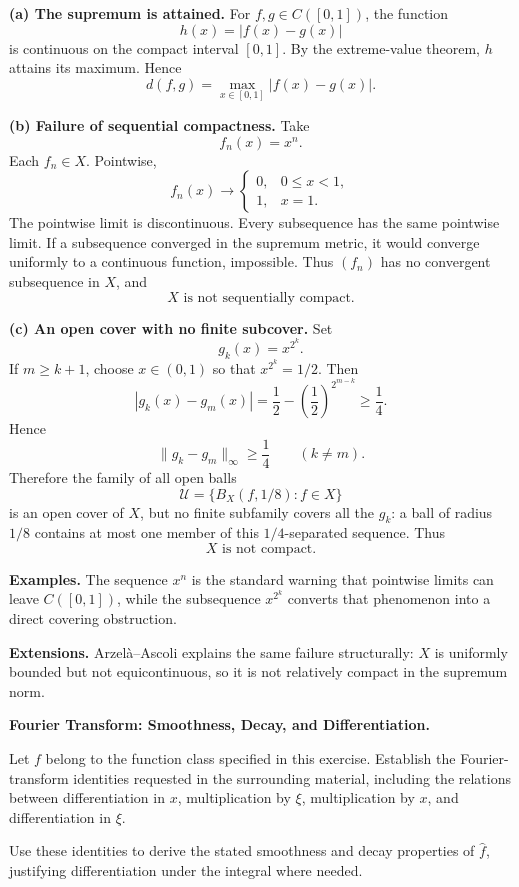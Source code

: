 \begin{solution}

\par\smallskip\noindent\textbf{(a) The supremum is attained.}
For \(f,g\in C([0,1])\), the function
\[
h(x)=|f(x)-g(x)|
\]
is continuous on the compact interval \([0,1]\). By the extreme-value
theorem, \(h\) attains its maximum. Hence
\[
\boxed{d(f,g)=\max_{x\in[0,1]}|f(x)-g(x)|.}
\]

\par\smallskip\noindent\textbf{(b) Failure of sequential compactness.}
Take
\[
f_n(x)=x^n.
\]
Each \(f_n\in X\). Pointwise,
\[
f_n(x)\to
\begin{cases}
0,&0\le x<1,\\
1,&x=1.
\end{cases}
\]
The pointwise limit is discontinuous. Every subsequence has the same pointwise
limit. If a subsequence converged in the supremum metric, it would converge
uniformly to a continuous function, impossible. Thus \((f_n)\) has no
convergent subsequence in \(X\), and
\[
\boxed{X\text{ is not sequentially compact}.}
\]

\par\smallskip\noindent\textbf{(c) An open cover with no finite subcover.}
Set
\[
g_k(x)=x^{2^k}.
\]
If \(m\ge k+1\), choose \(x\in(0,1)\) so that \(x^{2^k}=1/2\). Then
\[
|g_k(x)-g_m(x)|
=
\frac12-\left(\frac12\right)^{2^{m-k}}
\ge\frac14.
\]
Hence
\[
\|g_k-g_m\|_\infty\ge\frac14
\qquad(k\ne m).
\]
Therefore the family of all open balls
\[
\mathcal U=\{B_X(f,1/8):f\in X\}
\]
is an open cover of \(X\), but no finite subfamily covers all the \(g_k\): a
ball of radius \(1/8\) contains at most one member of this \(1/4\)-separated
sequence. Thus
\[
\boxed{X\text{ is not compact}.}
\]

\medskip
\noindent\textbf{Examples.}
The sequence \(x^n\) is the standard warning that pointwise limits can leave
\(C([0,1])\), while the subsequence \(x^{2^k}\) converts that phenomenon into
a direct covering obstruction.

\medskip
\noindent\textbf{Extensions.}
Arzel\`a--Ascoli explains the same failure structurally: \(X\) is uniformly
bounded but not equicontinuous, so it is not relatively compact in the
supremum norm.
\end{solution}


\begin{problem}[CP-II-0304]
\label{prob:cp-ii-0304}
\textbf{Fourier Transform: Smoothness, Decay, and Differentiation.}

\hspace*{1.5em}Let \(f\) belong to the function class specified in this exercise. Establish
the Fourier-transform identities requested in the surrounding material,
including the relations between differentiation in \(x\), multiplication by
\(\xi\), multiplication by \(x\), and differentiation in \(\xi\).

Use these identities to derive the stated smoothness and decay properties of
\(\widehat f\), justifying differentiation under the integral where needed.
\end{problem}

